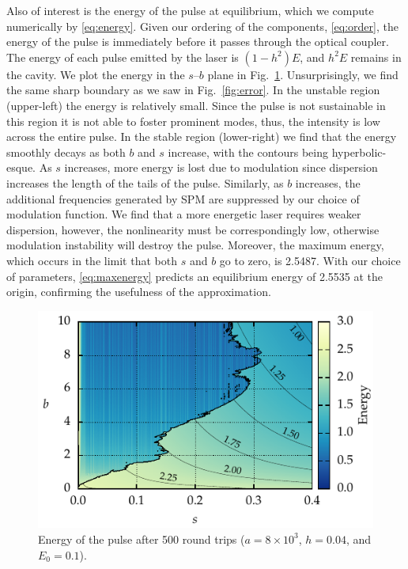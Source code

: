 \documentclass[9pt,twocolumn,twoside]{osajnl}
\begin{document}
Also of interest is the energy of the pulse at equilibrium, which we compute numerically by \eqref{eq:energy}. Given our ordering of the components, \eqref{eq:order}, the energy of the pulse is immediately before it passes through the optical coupler. The energy of each pulse emitted by the laser is $(1 - h^2) E$, and $h^2 E$ remains in the cavity. We plot the energy in the $s$--$b$ plane in Fig.~\ref{fig:energy}. Unsurprisingly, we find the same sharp boundary as we saw in Fig.~\ref{fig:error}. In the unstable region (upper-left) the energy is relatively small. Since the pulse is not sustainable in this region it is not able to foster prominent modes, thus, the intensity is low across the entire pulse. In the stable region (lower-right) we find that the energy smoothly decays as both $b$ and $s$ increase, with the contours being hyperbolic-esque. As $s$ increases, more energy is lost due to modulation since dispersion increases the length of the tails of the pulse. Similarly, as $b$ increases, the additional frequencies generated by SPM are suppressed by our choice of modulation function. We find that a more energetic laser requires weaker dispersion, however, the nonlinearity must be correspondingly low, otherwise modulation instability will destroy the pulse. Moreover, the maximum energy, which occurs in the limit that both $s$ and $b$ go to zero, is 2.5487. With our choice of parameters, \eqref{eq:maxenergy} predicts an equilibrium energy of 2.5535 at the origin, confirming the usefulness of the approximation.

\begin{figure}[tbp]
	\centering
	\includegraphics{Figures/ParamSpaceEnergy}
	\caption{Energy of the pulse after 500 round trips ($a = 8 \times 10^3$, $h = 0.04$, and $E_0 = 0.1$).}
	\label{fig:energy}
\end{figure}
\end{document}
